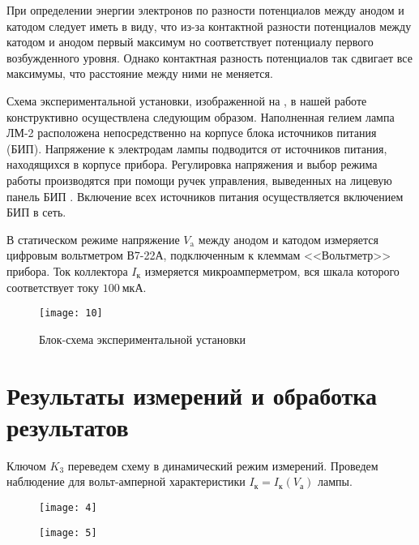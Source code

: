 \documentclass[a4paper, 12pt]{article}
\begin{document}
При определении энергии электронов по разности потенциалов между
анодом и катодом следует иметь в виду, что из-за контактной разности
потенциалов между катодом и анодом первый максимум но соответствует
потенциалу первого возбужденного уровня. Однако контактная разность
потенциалов так сдвигает все максимумы, что расстояние между ними не
меняется.

Схема экспериментальной установки, изображенной на , в
нашей работе конструктивно осуществлена следующим образом. Наполненная
гелием лампа ЛМ-2 расположена непосредственно на корпусе блока
источников питания (БИП). Напряжение к электродам лампы подводится от
источников питания, находящихся в корпусе прибора. Регулировка
напряжения и выбор режима работы производятся при помощи ручек
управления, выведенных на лицевую панель БИП . Включение
всех источников питания осуществляется включением БИП в сеть.

В статическом режиме напряжение $V_\text{a}$ между анодом и катодом
измеряется цифровым вольтметром В7-22А, подключенным к клеммам
<<Вольтметр>> прибора. Ток коллектора $I_\text{к}$ измеряется
микроамперметром, вся шкала которого соответствует току $100\
\text{мкА}$.


\begin{figure}[H]
    \texttt{[image: 10]} 
    \caption{Блок-схема экспериментальной установки}
    \label{fig:4}
\end{figure}





\section{Результаты измерений и обработка результатов}

Ключом $K_3$ переведем схему в динамический режим измерений. Проведем
наблюдение для вольт-амперной характеристики $I_\text{к} =
I_\text{к}(V_\text{а})$ лампы.


\begin{figure}[H]
    \begin{floatrow}

        {
        \texttt{[image: 4]}
    }

        {
        \texttt{[image: 5]}
    }
    \end{floatrow}
\end{figure}
\end{document}
